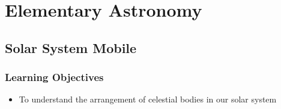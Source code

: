 \section{Elementary Astronomy}





\subsection{Solar System Mobile}

\subsubsection*{Learning Objectives}
\begin{itemize}
\item{To understand the arrangement of celestial bodies in our solar system}
\end{itemize}

